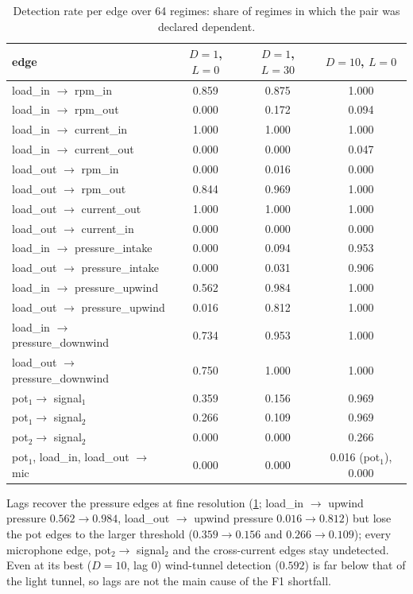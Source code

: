 \begin{table}[h]
\caption{Detection rate per edge over 64 regimes: share of regimes in which the pair was declared dependent.}
\label{tab:e2edges}
\centering
\begin{tabular}{lccc}
\toprule
edge & $D{=}1$, $L{=}0$ & $D{=}1$, $L{=}30$ & $D{=}10$, $L{=}0$ \\
\midrule
load\_in $\to$ rpm\_in & 0.859 & 0.875 & 1.000 \\
load\_in $\to$ rpm\_out & 0.000 & 0.172 & 0.094 \\
load\_in $\to$ current\_in & 1.000 & 1.000 & 1.000 \\
load\_in $\to$ current\_out & 0.000 & 0.000 & 0.047 \\
load\_out $\to$ rpm\_in & 0.000 & 0.016 & 0.000 \\
load\_out $\to$ rpm\_out & 0.844 & 0.969 & 1.000 \\
load\_out $\to$ current\_out & 1.000 & 1.000 & 1.000 \\
load\_out $\to$ current\_in & 0.000 & 0.000 & 0.000 \\
load\_in $\to$ pressure\_intake & 0.000 & 0.094 & 0.953 \\
load\_out $\to$ pressure\_intake & 0.000 & 0.031 & 0.906 \\
load\_in $\to$ pressure\_upwind & 0.562 & 0.984 & 1.000 \\
load\_out $\to$ pressure\_upwind & 0.016 & 0.812 & 1.000 \\
load\_in $\to$ pressure\_downwind & 0.734 & 0.953 & 1.000 \\
load\_out $\to$ pressure\_downwind & 0.750 & 1.000 & 1.000 \\
pot$_1\to$ signal$_1$ & 0.359 & 0.156 & 0.969 \\
pot$_1\to$ signal$_2$ & 0.266 & 0.109 & 0.969 \\
pot$_2\to$ signal$_2$ & 0.000 & 0.000 & 0.266 \\
pot$_1$, load\_in, load\_out $\to$ mic & 0.000 & 0.000 & 0.016 (pot$_1$), 0.000 \\
\bottomrule
\end{tabular}
\end{table}

Lags recover the pressure edges at fine resolution (\cref{tab:e2edges}; load\_\allowbreak in $\to$ upwind pressure $0.562\to0.984$, load\_\allowbreak out $\to$ upwind pressure $0.016\to0.812$) but lose the pot edges to the larger threshold ($0.359\to0.156$ and $0.266\to0.109$); every microphone edge, pot$_2\to$ signal$_2$ and the cross-current edges stay undetected.
Even at its best ($D=10$, lag 0) wind-tunnel detection ($0.592$) is far below that of the light tunnel, so lags are not the main cause of the F1 shortfall.

